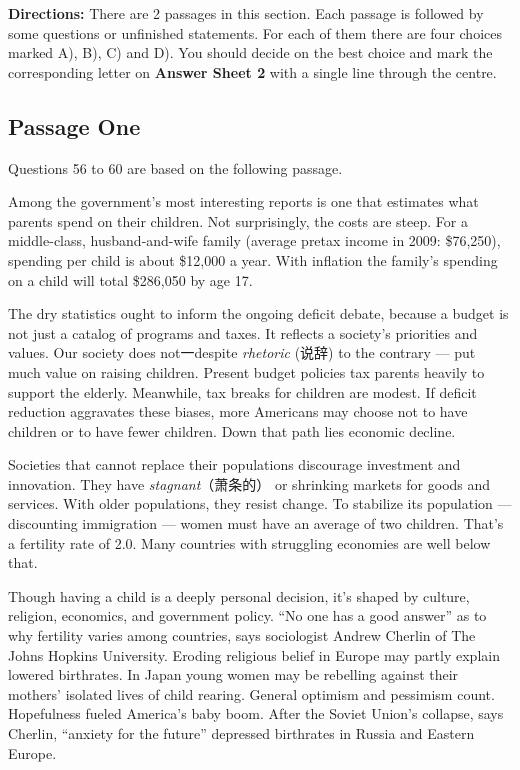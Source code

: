 \documentclass[UTF8,11pt]{ctexart}
\begin{document}
\textbf{Directions:} There are 2 passages in this section. Each passage is followed by some questions or unfinished statements. For each of them there are four choices marked A), B), C) and D). You should decide on the best choice and mark the corresponding letter on\textbf{ Answer Sheet 2} with a single line through the centre.


\subsection*{Passage One}


Questions 56 to 60 are based on the following passage.


Among the government’s most interesting reports is one that estimates what parents spend on their children. Not surprisingly, the costs are steep. For a middle-class, husband-and-wife family (average pretax income in 2009: \$76,250), spending per child is about \$12,000 a year. With inflation the family’s spending on a child will total \$286,050 by age 17.


The dry statistics ought to inform the ongoing deficit debate, because a budget is not just a catalog of programs and taxes. It reflects a society’s priorities and values. Our society does not一despite\textit{ rhetoric} (说辞) to the contrary — put much value on raising children. Present budget policies tax parents heavily to support the elderly. Meanwhile, tax breaks for children are modest. If deficit reduction aggravates these biases, more Americans may choose not to have children or to have fewer children. Down that path lies economic decline.


Societies that cannot replace their populations discourage investment and innovation. They have\textit{ stagnant}（萧条的） or shrinking markets for goods and services. With older populations, they resist change. To stabilize its population — discounting immigration — women must have an average of two children. That’s a fertility rate of 2.0. Many countries with struggling economies are well below that.


Though having a child is a deeply personal decision, it’s shaped by culture, religion, economics, and government policy. “No one has a good answer” as to why fertility varies among countries, says sociologist Andrew Cherlin of The Johns Hopkins University. Eroding religious belief in Europe may partly explain lowered birthrates. In Japan young women may be rebelling against their mothers’ isolated lives of child rearing. General optimism and pessimism count. Hopefulness fueled America’s baby boom. After the Soviet Union’s collapse, says Cherlin, “anxiety for the future” depressed birthrates in Russia and Eastern Europe.
\end{document}
